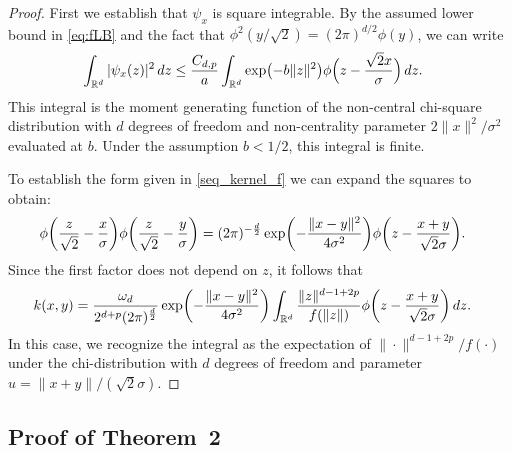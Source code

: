 \documentclass{article}
\theoremstyle{definition}
\newcommand{\reals}{\mathbb{R}}
\let\originalleft\left
\let\originalright\right
\renewcommand{\left}{\mathopen{}\mathclose\bgroup\originalleft}
\renewcommand{\right}{\aftergroup\egroup\originalright}
\begin{document}
\begin{proof}
First we establish that $\psi_x$ is square integrable. By the assumed lower bound in \eqref{eq:fLB} and the fact that $\phi^2(y/\sqrt{2}) = (2 \pi)^{d/2}  \phi(y)$, we can write
\begin{align}
\int_{\reals^d}  |\psi_x(z) |^2 \, dz &\le \frac{C_{d,p} }{a}  \int_{\reals^d}  \exp\left( - b \|z\|^2 \right) \phi\Big( z  - \frac{ \sqrt{2} x}{\sigma} \Big ) \, dz.
\end{align}
This integral is the moment generating function of the non-central chi-square distribution with $d$ degrees of freedom and non-centrality parameter $2 \|x\|^2/\sigma^2$ evaluated at $b$. Under the assumption $b < 1/2$, this integral is finite. 

To establish the form given in \eqref{seq_kernel_f} we can expand the squares to obtain:
\begin{align*}
\phi\left(\frac{ z}{\sqrt{2}}  - \frac{ x}{\sigma} \right ) \phi\left(\frac{ z}{\sqrt{2}}  - \frac{ y}{\sigma} \right ) %
& = (2\pi)^{-\frac{d}{2}}  \exp\left( - \frac{\|x-y\|^2}{4 \sigma^2} \right)\phi\left(z  - \frac{ x  +y}{\sqrt{2} \sigma} \right ).
\end{align*}
Since the first factor does not depend on $z$, it follows that
\begin{align*}
     k(x,y) & =\frac{ \omega_d}{2^{d + p} ( 2\pi)^{\frac{d}{2}} }  \exp\left( -\frac{ \|x-y\|^2}{ 4 \sigma^2}\right) \int_{\reals^d} \frac{ \|z\|^{d -1+2p}}{ f(\|z\|)} \phi\left(z  - \frac{ x  +y}{\sqrt{2} \sigma} \right ) \, dz. 
\end{align*}
In this case, we recognize the integral as the expectation of $\|\cdot\|^{d-1 + 2p}/f(\cdot)$ under the chi-distribution with $d$ degrees of freedom and parameter $u = \| x + y\|/(\sqrt{2}\sigma)$. 
\end{proof}


\subsection{Proof of Theorem~2}
\end{document}
